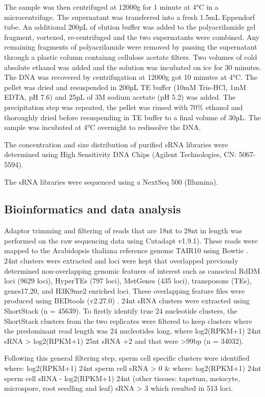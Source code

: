 The sample was then centrifuged at 12000g for 1 minute at 4°C in a microcentrifuge. The supernatant was transferred into a fresh 1.5mL Eppendorf tube. An additional 200µL of elution buffer was added to the polyacrilamide gel fragment, vortexed, re-centrifuged and the two supernatants were combined. Any remaining fragments of polyacrilamide were removed  by passing the supernatant through a plastic column containng cellulose acetate filters. Two volumes of cold absolute ethanol was added and the solution was incubated on ice for 30 minutes. The DNA was recovered by centrifugation at 12000g got 10 minutes at 4°C. The pellet was dried and resuspended in 200µL TE buffer (10mM Tris-HCl, 1mM EDTA, pH 7.6) and 25µL of 3M sodium acetate (pH 5.2) was added. The precipitation step was repeated, the pellet was rinsed with 70\% ethanol and thoroughly dried before resuspending in TE buffer to a final volume of 30µL. The sample was incubated at 4°C overnight to redissolve the DNA.

The concentration and size distribution of purified sRNA libraries were determined using  High Sensitivity DNA Chips (Agilent Technologies, CN: 5067-5594).

The sRNA libraries were sequenced using a NextSeq 500 (Illumina).

\subsection{Bioinformatics and data analysis}

Adaptor trimming and filtering of reads that are 18nt to 28nt in length was performed on the raw sequencing data using Cutadapt \citep{RN88} v1.9.1). These reads were mapped to the Arabidopsis thaliana reference genome TAIR10 using Bowtie \citep{RN89}. 24nt clusters were extracted and loci were kept that overlapped previously determined non-overlapping genomic features of interest such as canocical RdDM loci (9629 loci), HyperTEs (797 loci), MetGenes (435 loci), transposons (TEs), genes17,20, and H3K9me2 enriched loci. These overlapping feature files were produced using BEDtools (v2.27.0) \citep{RN90}. 24nt sRNA clusters were extracted using ShortStack \citep{RN142} (n = 45639). To firstly identify true 24 nucleotide clusters, the ShortStack clusters from the two replicates were filtered to keep clusters where the predominant read length was 24 nucleotides long, where log2(RPKM+1) 24nt sRNA > log2(RPKM+1) 25nt sRNA +2 and that were >99bp (n = 34032).

Following this general filtering step, sperm cell specific clusters were identified where:
log2(RPKM+1) 24nt sperm cell sRNA > 0 \& where:
log2(RPKM+1) 24nt sperm cell sRNA - log2(RPKM+1) 24nt (other tissues: tapetum, meiocyte, microspore, root seedling and leaf) sRNA > 3 which resulted in 513 loci.

